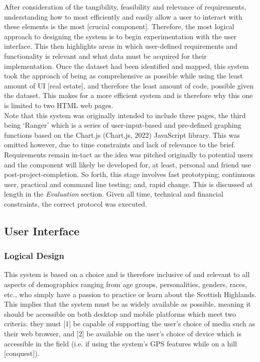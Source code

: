 \documentclass[11pt, english]{article}
\begin{document}
	After consideration of the tangibility, feasibility and relevance of requirements, understanding how to most efficiently and easily allow a user to interact with these elements is the most [crucial component]. Therefore, the most logical approach to designing the system is to begin experimentation with the user interface. This then highlights areas in which user-defined requirements and functionality is relevant and what data must be acquired for their implementation. Once the dataset had been identified and mapped, this system took the approach of being as comprehensive as possible while using the least amount of UI [real estate], and therefore the least amount of code, possible given the dataset. This makes for a more efficient system and is therefore why this one is limited to two HTML web pages.\\

	Note that this system was originally intended to include three pages, the third being `Ranger' which is a series of user-input-based and pre-defined graphing functions based on the Chart.js (Chart.js, 2022) JavaScript library. This was omitted however, due to time constraints and lack of relevance to the brief. Requirements remain in-tact as the idea was pitched originally to potential users and the component will likely be developed for, at least, personal and friend use post-project-completion. So forth, this stage involves fast prototyping; continuous user, practical and command line testing; and, rapid change. This is discussed at length in the \textit{Evaluation} section. Given all time, technical and financial constraints, the correct protocol was executed.

	\subsection{User Interface}

		\subsubsection{Logical Design}

	This system is based on a choice and is therefore inclusive of and relevant to all aspects of demographics ranging from age groups, personalities, genders, races, etc., who simply have a passion to practice or learn about the Scottish Highlands. This implies that the system must be as widely available as possible, meaning it should be accessible on both desktop and mobile platforms which meet two criteria: they must [1] be capable of supporting the user's choice of media such as their web browser, and [2] be available on the user's choice of device which is accessible in the field (i.e. if using the system's GPS features while on a hill [conquest]).\\
\end{document}
